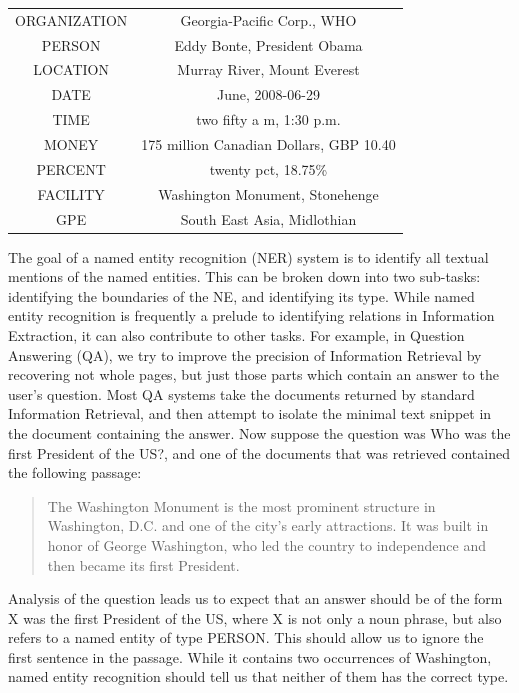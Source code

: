 \documentclass[LaM,binding=0.6cm]{sapthesis}
\begin{document}
\begin{center}
\begin{tabular}{ c c }
ORGANIZATION &	Georgia-Pacific Corp., WHO \\
PERSON 	& Eddy Bonte, President Obama \\
LOCATION &	Murray River, Mount Everest\\
DATE &	June, 2008-06-29\\
TIME &	two fifty a m, 1:30 p.m.\\
MONEY &	175 million Canadian Dollars, GBP 10.40\\
PERCENT &	twenty pct, 18.75\% \\
FACILITY &	Washington Monument, Stonehenge\\
GPE &	South East Asia, Midlothian \\
\end{tabular}
\end{center}

The goal of a named entity recognition (NER) system is to identify all textual mentions of the named entities. This can be broken down into two sub-tasks: identifying the boundaries of the NE, and identifying its type. While named entity recognition is frequently a prelude to identifying relations in Information Extraction, it can also contribute to other tasks. For example, in Question Answering (QA), we try to improve the precision of Information Retrieval by recovering not whole pages, but just those parts which contain an answer to the user's question. Most QA systems take the documents returned by standard Information Retrieval, and then attempt to isolate the minimal text snippet in the document containing the answer. Now suppose the question was Who was the first President of the US?, and one of the documents that was retrieved contained the following passage:

\begin{quote}
The Washington Monument is the most prominent structure in Washington, D.C. and one of the city's early attractions. It was built in honor of George Washington, who led the country to independence and then became its first President.
\end{quote}

Analysis of the question leads us to expect that an answer should be of the form X was the first President of the US, where X is not only a noun phrase, but also refers to a named entity of type PERSON. This should allow us to ignore the first sentence in the passage. While it contains two occurrences of Washington, named entity recognition should tell us that neither of them has the correct type.
\end{document}
